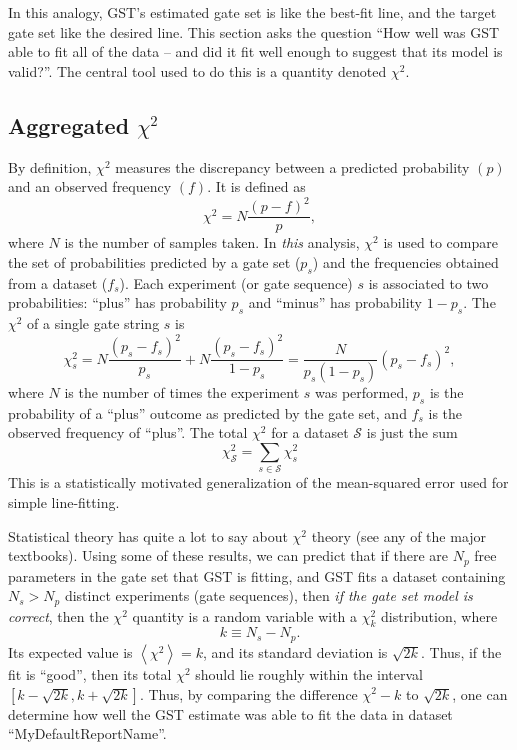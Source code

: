 \documentclass{article}[11pt]
\newcommand{\expec}[1]{\ensuremath{\left\langle#1\right\rangle}}
\begin{document}
In this analogy, GST's estimated gate set is like the best-fit line, and the target gate set like the desired line.  This section asks the question ``How well was GST able to fit all of the data -- and did it fit well enough to suggest that its model is valid?''. The central tool used to do this is a quantity denoted $\chi^2$.  

\subsection{Aggregated $\chi^2$}

By definition, $\chi^2$ measures the discrepancy between a predicted probability $(p)$ and an observed frequency $(f)$.  It is defined as
\begin{equation}
\chi^2 = N\frac{(p-f)^2}{p},
\end{equation}
where $N$ is the number of samples taken.  In \emph{this} analysis, $\chi^2$ is used to compare the set of probabilities predicted by a gate set ($p_s$) and the frequencies obtained from a dataset ($f_s$).  Each experiment (or gate sequence) $s$ is associated to two probabilities:  ``plus'' has probability $p_s$ and ``minus'' has probability $1-p_s$.  The $\chi^2$ of a single gate string $s$ is
\begin{equation}
\chi^2_s = N\frac{(p_s-f_s)^2}{p_s} + N\frac{(p_s-f_s)^2}{1-p_s} = \frac{N}{p_s(1-p_s)}(p_s-f_s)^2,\label{eqGateStringChi2}
\end{equation}
where $N$ is the number of times the experiment $s$ was performed, $p_s$ is the probability of a ``plus'' outcome as predicted by the gate set, and $f_s$ is the observed frequency of ``plus''.  The total $\chi^2$ for a dataset $\mathcal{S}$ is just the sum 
\begin{equation}
\chi^2_\mathcal{S} = \sum_{s\in\mathcal{S}}{ \chi^2_s}
\end{equation}
This is a statistically motivated generalization of the mean-squared error used for simple line-fitting.

Statistical theory has quite a lot to say about $\chi^2$ theory (see any of the major textbooks).  Using some of these results, we can predict that if there are $N_p$ free parameters in the gate set that GST is fitting, and GST fits a dataset containing $N_s > N_p$ distinct experiments (gate sequences), then \emph{if the gate set model is correct}, then the $\chi^2$ quantity is a random variable with a $\chi^2_{k}$ distribution, where
$$k \equiv N_s - N_p.$$
Its expected value is $\expec{\chi^2}=k$, and its standard deviation is $\sqrt{2k}$.  Thus, if the fit is ``good'', then its total $\chi^2$ should lie roughly within the interval $[k-\sqrt{2k},k+\sqrt{2k}]$.
Thus, by comparing the difference $\chi^2 - k$ to $\sqrt{2k}$, one can determine how well the GST estimate was able to fit the data in dataset ``MyDefaultReportName''.
\end{document}

